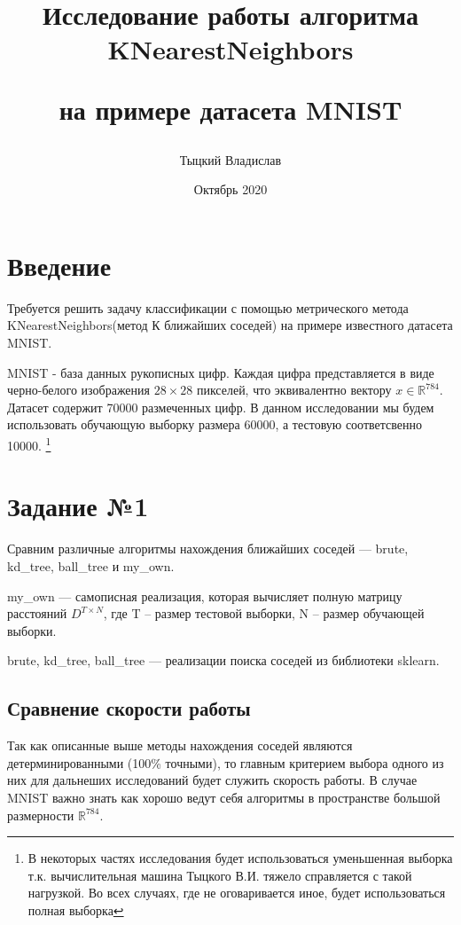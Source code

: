 \documentclass[12pt,fleqn]{article}
\title{Исследование работы алгоритма KNearestNeighbors 

на примере датасета MNIST}
\author{Тыцкий Владислав}
\date{Октябрь 2020}
\begin{document}
\maketitle

\section{Введение}
Требуется решить задачу классификации с помощью метрического метода KNearestNeighbors(метод К ближайших соседей)
 на примере известного датасета  MNIST.
 
 MNIST - база данных рукописных цифр. Каждая цифра представляется в виде  черно-белого изображения  $28\times28$ пикселей,
  что эквивалентно вектору 
 $x \in \mathbb{R}^{784}$. Датасет содержит 70000 размеченных цифр. В данном исследовании мы будем использовать 
 обучающую выборку размера 60000, а тестовую соответсвенно 10000.
 \footnote{В некоторых частях исследования будет использоваться уменьшенная выборка т.к. вычислительная 
 машина Тыцкого В.И. тяжело справляется с такой нагрузкой. Во всех случаях, где не оговаривается иное,
 будет использоваться полная выборка}

\section{Задание №1}
Сравним различные алгоритмы нахождения ближайших соседей --- brute, kd\_tree, ball\_tree и my\_own. 

my\_own --- самописная реализация, которая вычисляет полную матрицу расстояний $D^{T \times N}$, где T -- размер 
тестовой выборки, N -- размер обучающей выборки.

brute, kd\_tree, ball\_tree --- реализации поиска соседей из библиотеки sklearn.
\subsection{Сравнение скорости работы}
Так как описанные выше методы нахождения соседей являются детерминированными (100\% точными), то главным критерием 
выбора одного из них для дальнеших исследований будет служить скорость работы.
В случае MNIST важно знать как хорошо ведут себя алгоритмы в пространстве большой размерности $\mathbb{R}^{784}$. 
\end{document}
